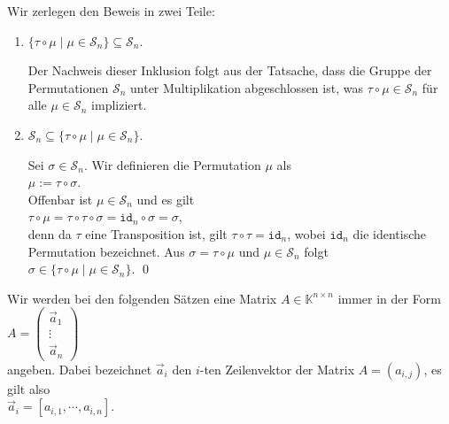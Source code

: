 \proof
Wir zerlegen den Beweis in zwei Teile:
\begin{enumerate}
\item $\{ \tau \circ \mu \mid \mu \in \mathcal{S}_n \} \subseteq \mathcal{S}_n$.

      Der Nachweis dieser Inklusion folgt aus der Tatsache, dass die Gruppe der Permutationen
      $\mathcal{S}_n$ unter Multiplikation abgeschlossen ist, was  
      $\tau \circ \mu \in \mathcal{S}_n$ f\"ur alle $\mu \in \mathcal{S}_n$ impliziert.
\item $\mathcal{S}_n \subseteq \{ \tau \circ \mu \mid \mu \in \mathcal{S}_n \}$.

      Sei $\sigma \in \mathcal{S}_n$.  Wir definieren die Permutation $\mu$ als
      \\[0.2cm]
      \hspace*{1.3cm}
      $\mu := \tau \circ \sigma$.
      \\[0.2cm]
      Offenbar ist $\mu \in \mathcal{S}_n$ und es gilt
      \\[0.2cm]
      \hspace*{1.3cm}
      $\tau \circ \mu = \tau \circ \tau \circ \sigma = \mathtt{id}_n \circ \sigma = \sigma$,
      \\[0.2cm]
      denn da $\tau$ eine Transposition ist, gilt $\tau \circ \tau = \mathtt{id}_n$, wobei
      $\mathtt{id}_n$ die identische Permutation bezeichnet.  Aus $\sigma = \tau \circ \mu$ und $\mu \in \mathcal{S}_n$ 
      folgt 
      \\[0.2cm]
      \hspace*{1.3cm}
      $\sigma \in \{ \tau \circ \mu \mid \mu \in \mathcal{S}_n \}$. \qed
\end{enumerate}

\noindent
Wir werden bei den folgenden S\"atzen eine Matrix $A \in \mathbb{K}^{n \times n}$ 
immer in der Form 
\\[0.2cm]
\hspace*{1.3cm}
$A = \left(
  \begin{array}{ll}
    \vec{a}_1 \\ \vdots \\ \vec{a}_n
  \end{array}
  \right)
$
\\[0.2cm]
angeben.  Dabei bezeichnet $\vec{a}_i$ den $i$-ten Zeilenvektor der Matrix $A = (a_{i,j})$, es
gilt also
\\[0.2cm]
\hspace*{1.3cm}
$\vec{a}_i = [a_{i,1}, \cdots, a_{i,n}]$.


